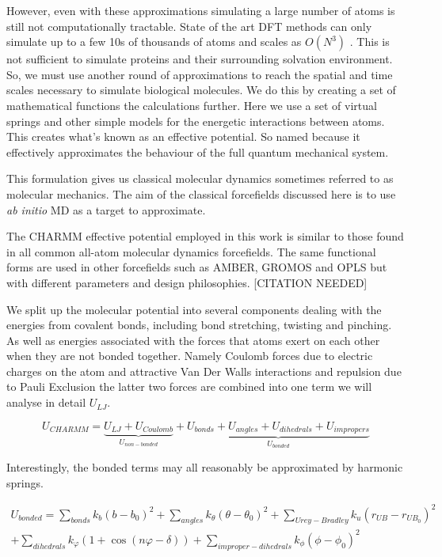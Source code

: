 However, even with these approximations simulating a large number of atoms is still not computationally tractable. State of the art DFT methods can only simulate up to a few 10s of thousands of atoms \cite{luo2020} and scales as $O(N^3)$ \cite{kresse1996}. This is not sufficient to simulate proteins and their surrounding solvation environment. So, we must use another round of approximations to reach the spatial and time scales necessary to simulate biological molecules. We do this by creating a set of mathematical functions the calculations further. Here we use a set of virtual springs and other simple models for the energetic interactions between atoms. This creates what's known as an effective potential. So named because it effectively approximates the behaviour of the full quantum mechanical system.

This formulation gives us classical molecular dynamics sometimes referred to as molecular mechanics. The aim of the classical forcefields discussed here is to use \textit {ab initio} MD as a target to approximate. 

The CHARMM effective potential employed in this work is similar to those found in all common all-atom molecular dynamics forcefields. The same  functional forms are used in other forcefields such as AMBER, GROMOS and OPLS but with different parameters and design philosophies. [CITATION NEEDED]

We split up the molecular potential into several components dealing with the energies from covalent bonds, including bond stretching, twisting and pinching. As well as energies associated with the forces that atoms exert on each other when they are not bonded together. Namely Coulomb forces due to electric charges on the atom and attractive Van Der Walls interactions and repulsion due to Pauli Exclusion the latter two forces are combined into one term we will analyse in detail $U_{LJ}$.

\begin{equation}
	U_{CHARMM} = \underbrace{U_{LJ} + U_{Coulomb}}_{U_{non-bonded}} + \underbrace{U_{bonds} + U_{angles} + U_{dihedrals} + U_{impropers}}_{U_{bonded} }
	\label{CHARMM}
\end{equation}

Interestingly, the bonded terms may all reasonably be approximated by harmonic springs. 

\begin{equation}\label{bonded_eqs}
	\begin{aligned}
	U_{bonded} = \sum_{bonds} k_{b} (b-b_0)^2 + \sum_{angles} k_\theta(\theta-\theta_0)^2+ \sum_{Urey-Bradley} k_u(r_{UB}-r_{UB_0})^2   \\ + \sum_{dihedrals} k_\varphi (1+\cos(n \varphi - \delta)) + \sum_{improper-dihedrals}  k_{\phi} (\phi - \phi_0)^2 
\end{aligned}
\end{equation}

